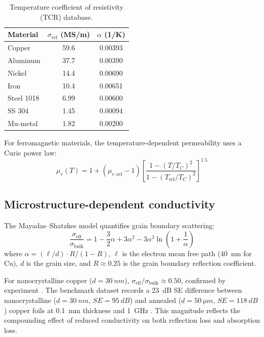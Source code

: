\documentclass[review,3p,authoryear]{elsarticle}
\begin{document}
\begin{table}[htbp]
\centering
\caption{Temperature coefficient of resistivity (TCR) database.}
\label{tab:tcr}
\begin{tabular}{@{}lcc@{}}
\toprule
Material & $\sigma_\mathrm{ref}$ (\si{MS/m}) & $\alpha$ (\si{1/K}) \\
\midrule
Copper      & 59.6 & 0.00393 \\
Aluminum    & 37.7 & 0.00390 \\
Nickel      & 14.4 & 0.00690 \\
Iron        & 10.4 & 0.00651 \\
Steel 1018  & 6.99 & 0.00600 \\
SS 304      & 1.45 & 0.00094 \\
Mu-metal    & 1.82 & 0.00200 \\
\bottomrule
\end{tabular}
\end{table}

For ferromagnetic materials, the temperature-dependent permeability uses a Curie power law:
\begin{equation}
\mu_r(T) = 1 + (\mu_{r,\mathrm{ref}} - 1)\left[\frac{1 - (T/T_C)^2}{1 - (T_\mathrm{ref}/T_C)^2}\right]^{1.5}
\label{eq:curie}
\end{equation}

\subsection{Microstructure-dependent conductivity}
\label{sec:mayadas}

The Mayadas--Shatzkes model \citep{Mayadas1970} quantifies grain boundary scattering:
\begin{equation}
\frac{\sigma_\mathrm{eff}}{\sigma_\mathrm{bulk}} = 1 - \frac{3}{2}\alpha + 3\alpha^2 - 3\alpha^3\ln\left(1 + \frac{1}{\alpha}\right)
\label{eq:mayadas}
\end{equation}
where $\alpha = (\ell/d) \cdot R/(1-R)$, $\ell$ is the electron mean free path (\SI{40}{nm} for Cu), $d$ is the grain size, and $R \approx 0.25$ is the grain boundary reflection coefficient.

For nanocrystalline copper ($d = \SI{30}{nm}$), $\sigma_\mathrm{eff}/\sigma_\mathrm{bulk} \approx 0.50$, confirmed by experiment \citep{Mayadas1970}. The benchmark dataset records a \SI{23}{dB} SE difference between nanocrystalline ($d = \SI{30}{nm}$, $SE = \SI{95}{dB}$) and annealed ($d = \SI{50}{\micro m}$, $SE = \SI{118}{dB}$) copper foils at \SI{0.1}{mm} thickness and \SI{1}{GHz} \citep{Schulz1988, Mayadas1970}. This magnitude reflects the compounding effect of reduced conductivity on both reflection loss and absorption loss.
\end{document}

